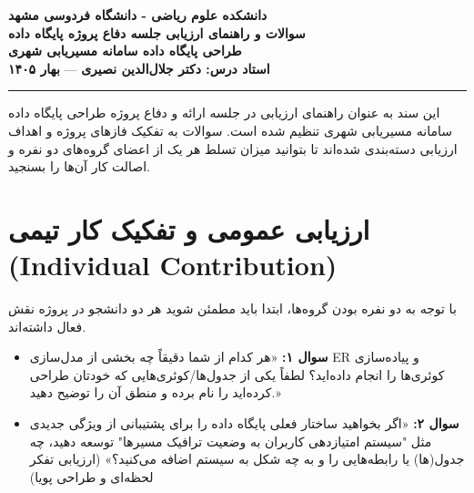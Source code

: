 \documentclass[12pt]{article}
\begin{document}
\begin{center}
    \large\textbf{دانشکده علوم ریاضی - دانشگاه فردوسی مشهد} \\
    \large\textbf{سوالات و راهنمای ارزیابی جلسه دفاع پروژه پایگاه داده} \\
    \textbf{طراحی پایگاه داده سامانه مسیریابی شهری} \\
    \textbf{استاد درس: دکتر جلال‌الدین نصیری} --- \textbf{بهار ۱۴۰۵}
\end{center}

\hrule
\vspace{0.4cm}

این سند به عنوان راهنمای ارزیابی در جلسه ارائه و دفاع پروژه طراحی پایگاه داده سامانه مسیریابی شهری تنظیم شده است. سوالات به تفکیک فازهای پروژه و اهداف ارزیابی دسته‌بندی شده‌اند تا بتوانید میزان تسلط هر یک از اعضای گروه‌های دو نفره و اصالت کار آن‌ها را بسنجید.

\section{ارزیابی عمومی و تفکیک کار تیمی (Individual Contribution)}
با توجه به دو نفره بودن گروه‌ها، ابتدا باید مطمئن شوید هر دو دانشجو در پروژه نقش فعال داشته‌اند.
\begin{itemize}[label=$\bullet$, leftmargin=*]
    \item \textbf{سوال ۱:} «هر کدام از شما دقیقاً چه بخشی از مدل‌سازی ER و پیاده‌سازی کوئری‌ها را انجام داده‌اید؟ لطفاً یکی از جدول‌ها/کوئری‌هایی که خودتان طراحی کرده‌اید را نام برده و منطق آن را توضیح دهید.»
    \item \textbf{سوال ۲:} «اگر بخواهید ساختار فعلی پایگاه داده را برای پشتیبانی از ویژگی جدیدی مثل "سیستم امتیازدهی کاربران به وضعیت ترافیک مسیرها" توسعه دهید، چه جدول(ها) یا رابطه‌هایی را و به چه شکل به سیستم اضافه می‌کنید؟» (ارزیابی تفکر لحظه‌ای و طراحی پویا)
\end{itemize}
\end{document}
